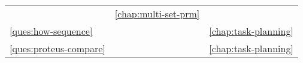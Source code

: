 \begin{center}
\begin{tabular}{llc}
\begin{minipage}[c]{0.75\columnwidth}
      \nameref{ques:multi-set-suited}
      \end{minipage}%
      & \ref{chap:multi-set-prm} \\[12pt]
   \ref{ques:how-sequence}
      &
      \begin{minipage}[c]{0.75\columnwidth}%
      \nameref{ques:how-sequence}
      \end{minipage}%
      & \ref{chap:task-planning} \\[12pt]
   \ref{ques:proteus-compare}
      &
      \begin{minipage}[c]{0.75\columnwidth}%
      \nameref{ques:proteus-compare}
      \end{minipage}%
      & \ref{chap:task-planning} \\[12pt]
\bottomrule
\end{tabular}
\end{center}

